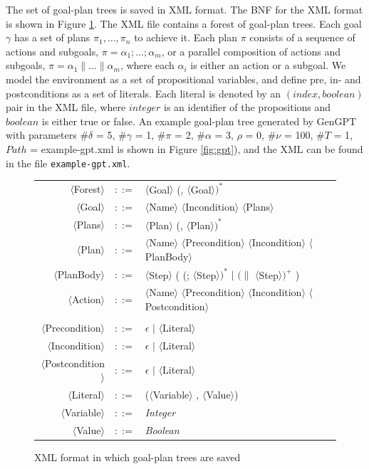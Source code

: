 \documentclass[11pt, a4paper]{article}
\begin{document}
The set of goal-plan trees is saved in XML format. The BNF for the XML format is shown in Figure \ref{fig:xml}. 
%
The XML file contains a forest of goal-plan trees. Each goal  $\gamma$ has a set of plans $\pi_1, \ldots, \pi_n$ to achieve it. Each plan $\pi$ consists of a sequence of actions and subgoals, $\pi = \alpha_1 ; \ldots ; \alpha_m$, or a parallel composition of actions and subgoals, $\pi = \alpha_1 \| \ldots \| \alpha_m$, where each $\alpha_i$ is either an action or a subgoal. We model the environment as a set of propositional variables, and define pre, in- and postconditions as a set of literals. Each literal is denoted by an $(index, boolean)$ pair in the XML file, where $integer$ is an identifier of the propositions and $boolean$ is either true or false.
%
An example goal-plan tree generated by GenGPT with parameters $\#\delta$ = 5, $\#\gamma$ = 1, $\#\pi$ = 2, $\#\alpha$ = 3, $\rho$ = 0, $\#\nu$ = 100, $\#T$ = 1, $Path$ = example-gpt.xml is shown in Figure \ref{fig:gpt}), and the XML can be found in the file \texttt{example-gpt.xml}.

\begin{figure}[!h]
\centering\small
\begin{tabular}{ r c l }
  $\langle$Forest$\rangle$ & $::=$ & $\langle$Goal$\rangle$ (, $\langle$Goal$\rangle$$)^*$\\
  $\langle$Goal$\rangle$ & $::=$ & $\langle$Name$\rangle$ $\langle$Incondition$\rangle$ $\langle$Plans$\rangle$  \\
  $\langle$Plans$\rangle$ & $::=$ & $\langle$Plan$\rangle$ (, $\langle$Plan$\rangle$$)^*$ \\
  $\langle$Plan$\rangle$ & $::=$ & $\langle$Name$\rangle$  $\langle$Precondition$\rangle$ $\langle$Incondition$\rangle$ $\setlength{\tabcolsep}{5pt}\langle$PlanBody$\rangle$\\
  $\langle$PlanBody$\rangle$ & $::=$ & $\langle$Step$\rangle$ ( (; $\langle$Step$\rangle$$)^*$ $|$ $(\|$ $\langle$Step$\rangle$$)^+$ ) \\
   $\langle$Action$\rangle$ & $::=$ & $\langle$Name$\rangle$ $\langle$Precondition$\rangle$ $\langle$Incondition$\rangle$ $\langle$Postcondition$\rangle$ \\

&& \\
  $\langle$Precondition$\rangle$ & $::=$ & \textbf{$\epsilon$} $|$ $\langle$Literal$\rangle$\\
 $\langle$Incondition$\rangle$ & $::=$ & \textbf{$\epsilon$} $|$ $\langle$Literal$\rangle$ \\
  $\langle$Postcondition$\rangle$ & $::=$ & \textbf{$\epsilon$} $|$ $\langle$Literal$\rangle$ \\
  $\langle$Literal$\rangle$ & $::=$ &  ($\langle$Variable$\rangle$ , $\langle$Value$\rangle$) \\
  $\langle$Variable$\rangle$ & $::=$ & \textit{Integer}  \\
  $\langle$Value$\rangle$ & $::=$ & \textit{Boolean} \\
\end{tabular}
\caption{XML format in which goal-plan trees are saved}
\label{fig:xml}
\end{figure}
\end{document}
